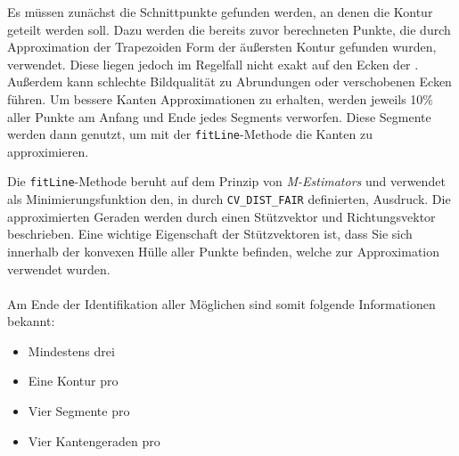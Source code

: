 Es müssen zunächst die Schnittpunkte gefunden werden, an denen die Kontur geteilt werden soll. Dazu werden die bereits zuvor berechneten Punkte, die durch Approximation der Trapezoiden Form der äußersten Kontur gefunden wurden, verwendet. Diese liegen jedoch im Regelfall nicht exakt auf den Ecken der \fps. Außerdem kann schlechte Bildqualität zu Abrundungen oder verschobenen Ecken führen. Um bessere Kanten Approximationen zu erhalten, werden jeweils 10\% aller Punkte am Anfang und Ende jedes Segments verworfen. Diese Segmente werden dann genutzt, um mit der \texttt{fitLine}-Methode die Kanten zu approximieren.

Die \texttt{fitLine}-Methode beruht auf dem Prinzip von \emph{M-Estimators} und verwendet als Minimierungsfunktion den, in \OpenCV durch \texttt{CV\_DIST\_FAIR} definierten, Ausdruck. Die approximierten Geraden werden durch einen Stützvektor und Richtungsvektor beschrieben. Eine wichtige Eigenschaft der Stützvektoren ist, dass Sie sich innerhalb der konvexen Hülle aller Punkte befinden, welche zur Approximation verwendet wurden.
\\\\
Am Ende der Identifikation aller Möglichen \fps sind somit folgende Informationen bekannt:
\begin{itemize}
	\item Mindestens drei \fps
	\item Eine Kontur pro \fp
	\item Vier Segmente pro \fp
	\item Vier Kantengeraden pro \fp
\end{itemize}
